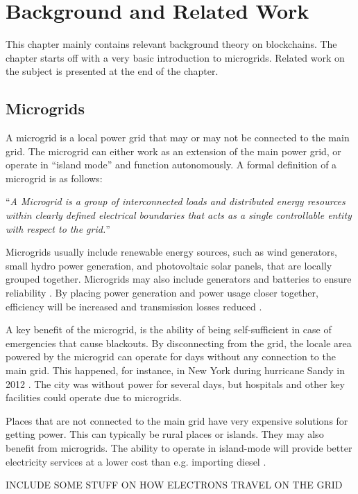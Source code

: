 \chapter{Background and Related Work}
This chapter mainly contains relevant background theory on blockchains. The chapter starts off with a very basic introduction to microgrids. Related work on the subject is presented at the end of the chapter. 

\section{Microgrids}
A microgrid is a local power grid that may or may not be connected to the main grid. The microgrid can either work as an extension of the main power grid, or operate in \enquote{island mode} and function autonomously. A formal definition of a microgrid is as follows: 

\enquote{\textit{A Microgrid is a group of interconnected loads and distributed energy resources within clearly defined electrical boundaries that acts as a single controllable entity with respect to the grid.}} \cite{micro_securicon}

Microgrids usually include renewable energy sources, such as wind generators, small hydro power generation, and photovoltaic solar panels, that are locally grouped together. Microgrids may also include generators and batteries to ensure reliability \cite{general_microgrid}. By placing power generation and power usage closer together, efficiency will be increased and transmission losses reduced \cite{Microgrid_konashevych}. 

A key benefit of the microgrid, is the ability of being self-sufficient in case of emergencies that cause blackouts. By disconnecting from the grid, the locale area powered by the microgrid can operate for days without any connection to the main grid. This happened, for instance, in New York during hurricane Sandy in 2012 \cite{sandy}. The city was without power for several days, but hospitals and other key facilities could operate due to microgrids. 

Places that are not connected to the main grid have very expensive solutions for getting power. This can typically be rural places or islands. They may also benefit from microgrids. The ability to operate in island-mode will provide better electricity services at a lower cost than e.g. importing diesel \cite{abb}.

INCLUDE SOME STUFF ON HOW ELECTRONS TRAVEL ON THE GRID 

